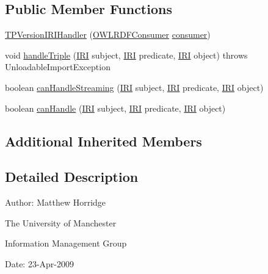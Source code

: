 \subsection*{Public Member Functions}
\begin{DoxyCompactItemize}
\item 
\hyperlink{classorg_1_1coode_1_1owlapi_1_1rdfxml_1_1parser_1_1_t_p_version_i_r_i_handler_af525e3acf0166125e1eec8ee66507cbd}{T\-P\-Version\-I\-R\-I\-Handler} (\hyperlink{classorg_1_1coode_1_1owlapi_1_1rdfxml_1_1parser_1_1_o_w_l_r_d_f_consumer}{O\-W\-L\-R\-D\-F\-Consumer} \hyperlink{classorg_1_1coode_1_1owlapi_1_1rdfxml_1_1parser_1_1_abstract_triple_handler_a4ccf4d898ff01eb1cadfa04b23d54e9c}{consumer})
\item 
void \hyperlink{classorg_1_1coode_1_1owlapi_1_1rdfxml_1_1parser_1_1_t_p_version_i_r_i_handler_ace01611a0b2715df502e3b1d33a4bcf4}{handle\-Triple} (\hyperlink{classorg_1_1semanticweb_1_1owlapi_1_1model_1_1_i_r_i}{I\-R\-I} subject, \hyperlink{classorg_1_1semanticweb_1_1owlapi_1_1model_1_1_i_r_i}{I\-R\-I} predicate, \hyperlink{classorg_1_1semanticweb_1_1owlapi_1_1model_1_1_i_r_i}{I\-R\-I} object)  throws Unloadable\-Import\-Exception 
\item 
boolean \hyperlink{classorg_1_1coode_1_1owlapi_1_1rdfxml_1_1parser_1_1_t_p_version_i_r_i_handler_a030972b081825afb01c5f59b5c3a38c6}{can\-Handle\-Streaming} (\hyperlink{classorg_1_1semanticweb_1_1owlapi_1_1model_1_1_i_r_i}{I\-R\-I} subject, \hyperlink{classorg_1_1semanticweb_1_1owlapi_1_1model_1_1_i_r_i}{I\-R\-I} predicate, \hyperlink{classorg_1_1semanticweb_1_1owlapi_1_1model_1_1_i_r_i}{I\-R\-I} object)
\item 
boolean \hyperlink{classorg_1_1coode_1_1owlapi_1_1rdfxml_1_1parser_1_1_t_p_version_i_r_i_handler_a74ab25b73dae44f6e1e6367920f8a9ba}{can\-Handle} (\hyperlink{classorg_1_1semanticweb_1_1owlapi_1_1model_1_1_i_r_i}{I\-R\-I} subject, \hyperlink{classorg_1_1semanticweb_1_1owlapi_1_1model_1_1_i_r_i}{I\-R\-I} predicate, \hyperlink{classorg_1_1semanticweb_1_1owlapi_1_1model_1_1_i_r_i}{I\-R\-I} object)
\end{DoxyCompactItemize}
\subsection*{Additional Inherited Members}


\subsection{Detailed Description}
Author\-: Matthew Horridge\par
 The University of Manchester\par
 Information Management Group\par
 Date\-: 23-\/\-Apr-\/2009 

